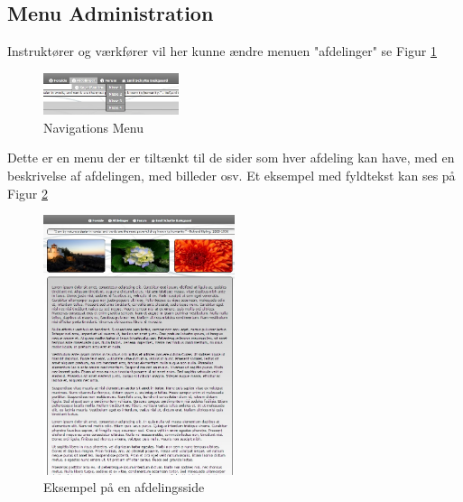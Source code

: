 \documentclass{article}
\begin{document}
\subsection*{Menu Administration}
Instruktører og værkfører vil her kunne ændre menuen "afdelinger" se Figur \ref{fig:11}
\begin{figure}[ht]
\begin{center}
\includegraphics[width=150px]{navMenu.jpg}
\end{center}

\caption{Navigations Menu}

\label{fig:11}
\end{figure}
Dette er en menu der er tiltænkt til de sider som hver afdeling kan have, med en beskrivelse af afdelingen, med billeder osv. 
Et eksempel med fyldtekst kan ses på Figur \ref{fig:12}
\begin{figure}[ht]
\begin{center}
\includegraphics[width=0.5\textwidth]{afdelingsside.jpg}
\end{center}

\caption{Eksempel på en afdelingsside}
\label{fig:12}
\end{figure}
\end{document}

